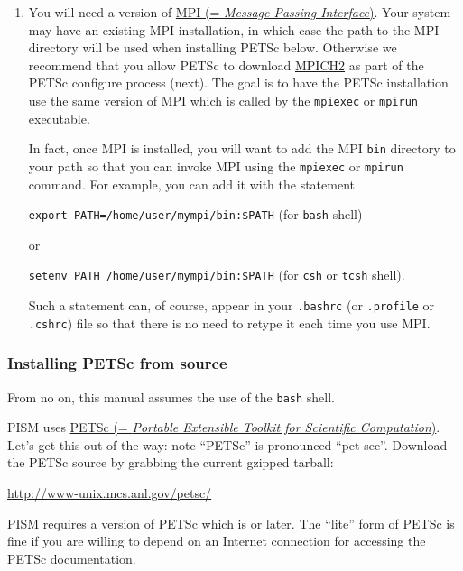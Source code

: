 \documentclass[titlepage,letterpaper,final]{scrartcl}
\begin{document}
\begin{enumerate}
\item You will need a version of \href{http://www-unix.mcs.anl.gov/mpi/}{MPI (=
    \emph{Message Passing Interface})}. Your system may have an existing MPI installation, in which
  case the path to the MPI directory will be used when installing PETSc below.
  Otherwise we recommend that you allow PETSc to download
  \href{http://www-unix.mcs.anl.gov/mpi/mpich2/}{MPICH2} as part of the PETSc
  configure process (next).  The goal is to have the PETSc installation use the
  same version of MPI which is called by the \texttt{mpiexec} or \texttt{mpirun}
  executable.

  In fact, once MPI is installed, you will
  want to add the MPI \texttt{bin} directory to your path so that you can
  invoke MPI using the \texttt{mpiexec} or \texttt{mpirun} command. For
  example, you can add it with the statement

\texttt{export PATH=/home/user/mympi/bin:\$PATH}  \qquad (for \texttt{bash} shell)

\noindent or

\texttt{setenv PATH /home/user/mympi/bin:\$PATH}  \qquad (for \texttt{csh} or \texttt{tcsh} shell).

\noindent Such a statement can, of course, appear in your \texttt{.bashrc} (or
\texttt{.profile} or \texttt{.cshrc}) file so that there is no need to retype
it each time you use MPI.

\end{enumerate}


\subsubsection{Installing PETSc from source}
\label{subsec:prereq-petsc}

From no on, this manual assumes the use of the \texttt{bash} shell.
\medskip

PISM uses \href{http://www-unix.mcs.anl.gov/petsc/}{PETSc (=
    \emph{Portable Extensible Toolkit for Scientific
      Computation})}. Let's get this out of the way: note ``PETSc''
  is pronounced ``pet-see''. Download the PETSc source by grabbing the current
  gzipped tarball:
\begin{center}
    \url{http://www-unix.mcs.anl.gov/petsc/}
\end{center}
PISM requires a version of PETSc which is \texttt{\PETSCREL} or later. The
``lite'' form of PETSc is fine if you are willing to depend on an Internet
connection for accessing the PETSc documentation.
\end{document}
